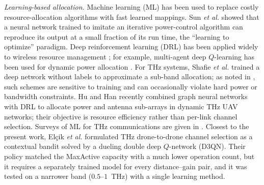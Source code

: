 \documentclass[correspondence]{IEEEtaes}
\begin{document}
\emph{Learning-based allocation.} Machine learning (ML) has been used to replace costly
resource-allocation algorithms with fast learned mappings. Sun \emph{et al.}
\cite{sun2018learning} showed that a neural network trained to imitate an iterative
power-control algorithm can reproduce its output at a small fraction of its run time,
the ``learning to optimize'' paradigm. Deep reinforcement learning (DRL) has been applied
widely to wireless resource management \cite{luong2019drl}; for example, multi-agent deep
$Q$-learning has been used for dynamic power allocation \cite{nasir2019marl}. For THz
systems, Shafie \emph{et al.} \cite{shafie2022unsupervised} trained a deep network without
labels to approximate a sub-band allocation; as noted in \cite{elcik2025d3qn}, such
schemes are sensitive to training and can occasionally violate hard power or bandwidth
constraints. Hu and Han \cite{hu2025glove}
recently combined graph neural networks with DRL to allocate power and antenna sub-arrays
in dynamic THz UAV networks; their objective is resource efficiency rather than per-link
channel selection. Surveys of ML for THz communications are given in
\cite{farhad2023thzai}. Closest to the present work, Elçik \emph{et al.}
\cite{elcik2025d3qn} formulated THz drone-to-drone channel selection as a contextual
bandit solved by a dueling double deep $Q$-network (D3QN). Their policy matched the
MaxActive capacity with a much lower operation count, but it requires a separately
trained model for every distance--gain pair, and it was tested on a narrower band
($0.5$--$1$~THz) with a single learning method.
\end{document}
